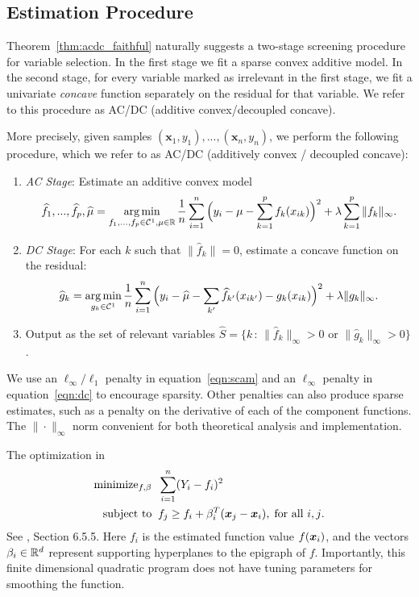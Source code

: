\subsection{Estimation Procedure}
\label{sec:acdc}

Theorem~\ref{thm:acdc_faithful} naturally suggests a two-stage screening procedure for
variable selection.  In the first stage we fit a sparse convex additive model.
In the second stage, for every variable marked as irrelevant in the first stage,
we fit a univariate \emph{concave} function separately on the residual for
that variable. We refer to this procedure as AC/DC (additive
convex/decoupled concave).

More precisely, given samples  
$(\mathbf{x}_1, y_1), ..., (\mathbf{x}_n, y_n)$, 
we perform the following procedure, which we refer to as AC/DC (additively convex / decoupled concave):
\begin{enumerate}
\item {\it AC Stage}: Estimate an additive convex model
\begin{equation}
\label{eqn:scam}
\widehat{f}_1, ..., \widehat{f}_p, \widehat \mu  = \mathop{\text{\rm arg\,min}}_{f_1,...,f_p \in
  \mathcal{C}^1, \mu\in{\mathbb R}} 
   \frac{1}{n} \sum_{i=1}^n \Big(y_i - \mu - \sum_{k=1}^p f_k(x_{ik}) \Big)^2 
       + \lambda \sum_{k=1}^p \| f_k \|_\infty.
\end{equation}
\item {\it DC Stage}: For each $k$ such that $\| \hat{f}_k \| = 0$, estimate
  a concave function on the residual:
\begin{equation}
\label{eqn:dc}
\widehat{g}_k = \mathop{\text{\rm arg\,min}}_{g_k \in \mathcal{C}^1} 
   \frac{1}{n} \sum_{i=1}^n \Big( y_i - \widehat \mu - \sum_{k'} \widehat{f}_{k'}(x_{ik'}) 
    - g_k(x_{ik})\Big)^2 
      + \lambda \| g_k \|_\infty.
\end{equation}
\item Output as the set of relevant variables
$\hat S = \{ k \,:\, \| \hat{f}_k \|_\infty > 0 
  \textrm{ or } \| \hat{g}_k \|_\infty > 0 \}$. 
\end{enumerate}

We use an $\ell_\infty/\ell_1$ penalty in equation~\eqref{eqn:scam}
and an $\ell_\infty$ penalty in equation~\eqref{eqn:dc} to encourage
sparsity.  Other penalties can also produce
sparse estimates, such as a penalty on the derivative of each of the
component functions.  The $\|\cdot\|_\infty$ norm convenient for both
theoretical analysis and implementation.

The optimization in 
\begin{align}
\label{eq:convreg}
\begin{split}
\text{minimize}_{f, \beta} & \;\; \sum_{i=1}^n (Y_i - f_i)^2 \\
\text{subject to} & \;\; f_j \geq f_i + \beta_i^T (\mbox{\boldmath $x$}_j-\mbox{\boldmath $x$}_i),\; \text{for
    all $i,j$}.
\end{split}
\end{align}
See \cite{Boyd04}, Section 6.5.5.
Here $f_i$ is the estimated function value $f(\mbox{\boldmath $x$}_i)$, and the vectors
$\beta_i \in {\mathbb R}^d$ represent supporting hyperplanes to the
epigraph of $f$.  Importantly, this finite dimensional quadratic program does
not have tuning parameters for smoothing the function. 



